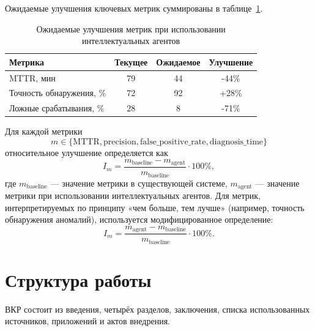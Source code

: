Ожидаемые улучшения ключевых метрик суммированы в таблице~\ref{tab:expected_improvements}.

\begin{table}[H]
\centering
\small
\caption{Ожидаемые улучшения метрик при использовании интеллектуальных агентов}
\label{tab:expected_improvements}
\begin{tabular}{|p{5cm}|c|c|c|}
\hline
\textbf{Метрика} & \textbf{Текущее} & \textbf{Ожидаемое} & \textbf{Улучшение} \\
\hline
MTTR, мин & 79 & 44 & -44\% \\
\hline
Точность обнаружения, \% & 72 & 92 & +28\% \\
\hline
Ложные срабатывания, \% & 28 & 8 & -71\% \\
\hline
\end{tabular}
\end{table}

Для каждой метрики
\[
  m \in \{
    \text{MTTR},
    \text{precision},
    \text{false\_positive\_rate},
    \text{diagnosis\_time}
  \}
\]
относительное улучшение определяется как
\begin{equation}
  I_m = \frac{m_{\text{baseline}} - m_{\text{agent}}}{m_{\text{baseline}}} \cdot 100\%,
\end{equation}
где \(m_{\text{baseline}}\) — значение метрики в существующей системе, \(m_{\text{agent}}\) — значение метрики при использовании интеллектуальных агентов. Для метрик, интерпретируемых по принципу «чем больше, тем лучше» (например, точность обнаружения аномалий), используется модифицированное определение:
\begin{equation}
  I_m = \frac{m_{\text{agent}} - m_{\text{baseline}}}{m_{\text{baseline}}} \cdot 100\%.
\end{equation}


\section*{Структура работы}

ВКР состоит из введения, четырёх разделов, заключения, списка использованных источников, приложений и актов внедрения.

